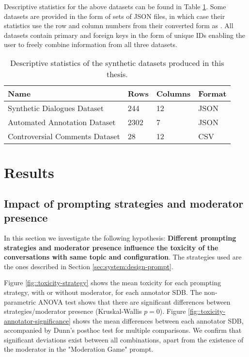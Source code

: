 Descriptive statistics for the above datasets can be found in Table \ref{tab:datasets}. Some datasets are provided in the form of sets of JSON files, in which case their statistics use the row and column numbers from their converted form as . All datasets contain primary and foreign keys in the form of unique IDs enabling the user to freely combine information from all three datasets.


\begin{table}
	\begin{tabular}
		{ |p{6cm}|p{1cm}|p{1.5cm}|p{2cm}|}
		\hline
		\cellcolor{blue!25}\textbf{Name} & \cellcolor{blue!25}\textbf{Rows} & \cellcolor{blue!25}\textbf{Columns} & \cellcolor{blue!25}\textbf{Format}\\
		\hline
		Synthetic Dialogues Dataset & 244 & 12 & JSON\\
		\hline
		Automated Annotation Dataset & 2302 & 7 & JSON\\
		\hline
		Controversial Comments Dataset & 28 & 12 & CSV\\
		\hline
	\end{tabular}
	\caption{Descriptive statistics of the synthetic datasets produced in this thesis.}
	\label{tab:datasets}
\end{table}



\section{Results}
\label{sec:evaluation:analysis}

\subsection{Impact of prompting strategies and moderator presence}
\label{ssec:evaluation:users}

In this section we investigate the following hypothesis: \textbf{Different prompting strategies and moderator presence influence the toxicity of the conversations with same topic and configuration}. The strategies used are the ones described in Section \ref{sec:system:design-prompt}.

Figure \ref{fig::toxicity-strategy} shows the mean toxicity for each prompting strategy, with or without moderator, for each annotator SDB. The non-parametric ANOVA test shows that there are significant differences between strategies/moderator presence (Kruskal-Wallis $p=0$). Figure \ref{fig::toxicity-annotator-significance} shows the mean differences between each annotator SDB, accompanied by Dunn's posthoc test for multiple comparisons. We confirm that significant deviations exist between all combinations, apart from the existence of the moderator in the "Moderation Game" prompt.

